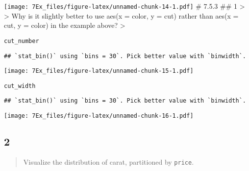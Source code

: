 \documentclass[]{article}
\newenvironment{Shaded}{\begin{snugshade}}{\end{snugshade}}
\newcommand{\DataTypeTok}[1]{\textcolor[rgb]{0.13,0.29,0.53}{#1}}
\newcommand{\DecValTok}[1]{\textcolor[rgb]{0.00,0.00,0.81}{#1}}
\newcommand{\KeywordTok}[1]{\textcolor[rgb]{0.13,0.29,0.53}{\textbf{#1}}}
\newcommand{\NormalTok}[1]{#1}
\newcommand{\OperatorTok}[1]{\textcolor[rgb]{0.81,0.36,0.00}{\textbf{#1}}}
\newcommand{\StringTok}[1]{\textcolor[rgb]{0.31,0.60,0.02}{#1}}
\begin{document}
\texttt{[image: 7Ex\_files/figure-latex/unnamed-chunk-14-1.pdf]} \# 7.5.3
\#\# 1 \textgreater{} \textgreater{} Why is it slightly better to use
aes(x = color, y = cut) rather than aes(x = cut, y = color) in the
example above? \textgreater{}

\texttt{cut\_number}

\begin{Shaded}
\end{Shaded}

\begin{verbatim}
## `stat_bin()` using `bins = 30`. Pick better value with `binwidth`.
\end{verbatim}

\texttt{[image: 7Ex\_files/figure-latex/unnamed-chunk-15-1.pdf]}

\texttt{cut\_width}

\begin{Shaded}
\end{Shaded}

\begin{verbatim}
## `stat_bin()` using `bins = 30`. Pick better value with `binwidth`.
\end{verbatim}

\texttt{[image: 7Ex\_files/figure-latex/unnamed-chunk-16-1.pdf]}

\hypertarget{section-18}{%
\subsection{2}\label{section-18}}

\begin{quote}
Visualize the distribution of carat, partitioned by \texttt{price}.
\end{quote}
\end{document}
